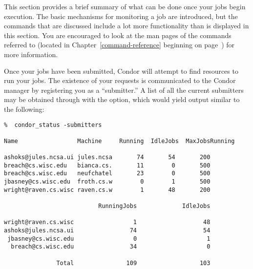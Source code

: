 This section provides a brief summary of what can be done once your jobs
begin execution. The basic mechanisms for monitoring a job are
introduced, but the commands that are discussed include a lot more
functionality than is displayed in this section. You are encouraged to
look at the man pages of the commands referred to (located in
Chapter~\ref{command-reference} beginning on
page~\pageref{command-reference}) for more information. 

Once your jobs have been submitted, Condor will attempt to find resources
to run your jobs.  The existence of your requests is communicated to the
Condor manager by registering you as a ``submitter.''  A list of all the
current submitters may be obtained through  with the 
 option, which would yield output similar to the following:
\begin{verbatim}
%  condor_status -submitters

Name                 Machine     Running  IdleJobs  MaxJobsRunning

ashoks@jules.ncsa.ui jules.ncsa       74       54       200
breach@cs.wisc.edu   bianca.cs.       11        0       500
breach@cs.wisc.edu   neufchatel       23        0       500
jbasney@cs.wisc.edu  froth.cs.w        0        1       500
wright@raven.cs.wisc raven.cs.w        1       48       200

                           RunningJobs             IdleJobs

wright@raven.cs.wisc                 1                   48
ashoks@jules.ncsa.ui                74                   54
 jbasney@cs.wisc.edu                 0                    1
  breach@cs.wisc.edu                34                    0

               Total               109                  103
\end{verbatim}

